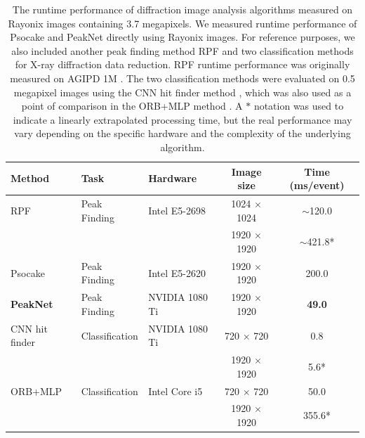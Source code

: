 \documentclass[conference]{IEEEtran}
\newcommand{\peaknet}{PeakNet}
\newcommand{\psocake}{Psocake}
\begin{document}
\begin{table}[htbp]
\caption{
    The runtime performance of diffraction image analysis algorithms measured on
    Rayonix images containing 3.7 megapixels.  We measured runtime performance
    of \psocake{} and \peaknet{} directly using Rayonix images.  For reference
    purposes, we also included another peak finding method RPF
    \citep{hadian-jaziPeakfindingAlgorithmBased2017,
    hadian-jaziDataReductionSerial2021} and two classification methods for X-ray
    diffraction data reduction. RPF runtime performance was originally measured
    on AGIPD 1M \citep{allahgholiAdaptiveGainIntegrating2019}.  The two
    classification methods were evaluated on 0.5 megapixel images using the CNN
    hit finder method \citep{keConvolutionalNeuralNetworkbased2018}, which was
    also used as a point of comparison in the ORB+MLP method
    \citep{rahmaniDataReductionXray2023}. A $*$ notation was used to indicate a
    linearly extrapolated processing time, but the real performance may vary
    depending on the specific hardware and the complexity of the underlying
    algorithm.
}
\label{tb : runtime}
\centering
\begin{tabular}{  | l || l | l | c | c | }
    \hline
    Method      &  Task & Hardware & Image size           & Time (ms/event)  \\
    \hline
    RPF         &  Peak Finding & Intel E5-2698 & 1024 $\times$ 1024 & $\sim$120.0            \\
                &               &               & 1920 $\times$ 1920 &
                $\sim$421.8*            \\
    \hline
    \psocake{}  &  Peak Finding & Intel E5-2620 & 1920 $\times$ 1920 & 200.0             \\
    \hline
    \textbf{\peaknet{}}  &  Peak Finding & NVIDIA 1080 Ti & 1920 $\times$ 1920 &
    \textbf{49.0}            \\
    \hline
    CNN hit finder  & Classification & NVIDIA 1080 Ti &  720 $\times$ 720 & 0.8 \\
                                                     & &                & 1920
                                                      $\times$ 1920 & 5.6* \\
    \hline
    ORB+MLP  & Classification & Intel Core i5  & 720 $\times$ 720 & 50.0 \\
                                                     & &                & 1920
                                                      $\times$ 1920 & 355.6* \\
    \hline
\end{tabular}
\end{table}
\end{document}
